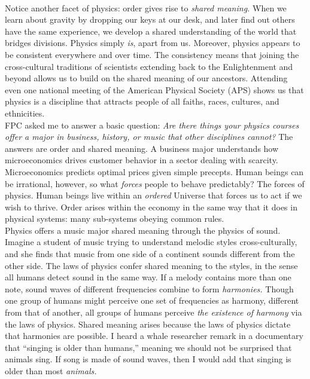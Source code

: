 \documentclass[../../../main.tex]{subfiles}
\begin{document}
\\
\vspace{0.15cm}
Notice another facet of physics: order gives rise to \textit{shared meaning.}  When we learn about gravity by dropping our keys at our desk, and later find out others have the same experience, we develop a shared understanding of the world that bridges divisions.  Physics simply \textit{is}, apart from us.  Moreover, physics appears to be consistent everywhere and over time.  The consistency means that joining the cross-cultural traditions of scientists extending back to the Enlightenment and beyond allows us to build on the shared meaning of our ancestors.  Attending even one national meeting of the American Physical Society (APS) shows us that physics is a discipline that attracts people of all faiths, races, cultures, and ethnicities.
\\
\vspace{0.15cm}
FPC asked me to answer a basic question: \textit{Are there things your physics courses offer a major in business, history, or music that other disciplines cannot?}  The answers are order and shared meaning.  A business major understands how microeconomics drives customer behavior in a sector dealing with scarcity.  Microeconomics predicts optimal prices given simple precepts.  Human beings can be irrational, however, so what \textit{forces} people to behave predictably?  The forces of physics.  Human beings live within an \textit{ordered} Universe that forces us to act if we wish to thrive.  Order arises within the economy in the same way that it does in physical systems: many sub-systems obeying common rules.
\\
\vspace{0.15cm}
Physics offers a music major shared meaning through the physics of sound.  Imagine a student of music trying to understand melodic styles cross-culturally, and she finds that music from one side of a continent sounds different from the other side.  The laws of physics confer shared meaning to the styles, in the sense all humans detect sound in the same way.  If a melody contains more than one note, sound waves of different frequencies combine to form \textit{harmonies.}  Though one group of humans might perceive one set of frequencies as harmony, different from that of another, all groups of humans perceive \textit{the existence of harmony} via the laws of physics.  Shared meaning arises because the laws of physics dictate that harmonies are possible.  I heard a whale researcher remark in a documentary that ``singing is older than humans,'' meaning we should not be surprised that animals sing.  If song is made of sound waves, then I would add that singing is older than most \textit{animals.}
\end{document}

